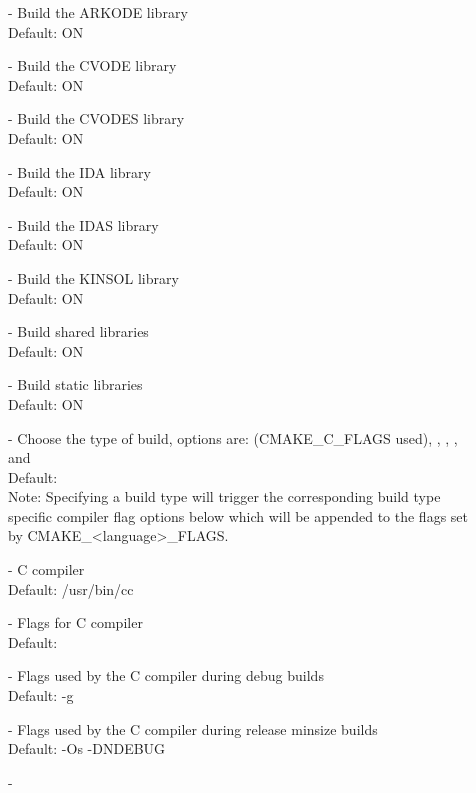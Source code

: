 \begin{description}
\item[] -
  Build the ARKODE library
  \\
  Default: ON
\item[] -
  Build the CVODE library
  \\
  Default: ON
\item[] -
  Build the CVODES library
  \\
  Default: ON
\item[] -
   Build the IDA library
  \\
   Default: ON
\item[] -
  Build the IDAS library
  \\
  Default: ON
\item[] -
  Build the KINSOL library
  \\
  Default: ON
\item[] -
  Build shared libraries
  \\
  Default: ON
\item[] -
  Build static libraries
  \\
  Default: ON
\item[] -
  Choose the type of build, options are:
   (CMAKE\_C\_FLAGS used), , ,
  , and 
  \\
  Default:
  \\
  Note: Specifying a build type will trigger the corresponding
  build type specific compiler flag options below which will be
  appended to the flags set by
  CMAKE\_{\textless}language{\textgreater}\_FLAGS.
\item[] -
  C compiler
  \\
  Default: /usr/bin/cc
\item[] -
  Flags for C compiler
  \\
  Default:
\item[] -
  Flags used by the C compiler during debug builds
  \\
  Default: -g
\item[] -
  Flags used by the C compiler during release minsize builds
  \\
  Default: -Os -DNDEBUG
\item[] -

\end{description}
